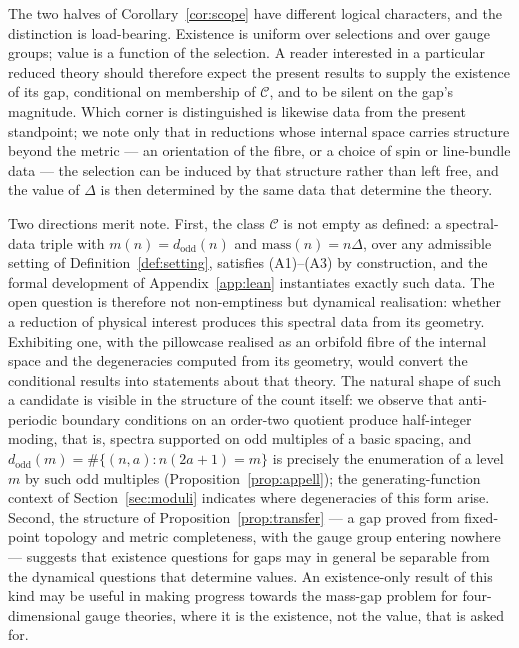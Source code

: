 \documentclass[11pt,a4paper]{article}
\newcommand{\dodd}{d_{\mathrm{odd}}}
\newcommand{\class}{\mathcal{C}}
\theoremstyle{plain}
\theoremstyle{definition}
\theoremstyle{remark}
\begin{document}
The two halves of Corollary~\ref{cor:scope} have different logical characters, and the distinction is load-bearing. Existence is uniform over selections and over gauge groups; value is a function of the selection. A reader interested in a particular reduced theory should therefore expect the present results to supply the existence of its gap, conditional on membership of $\class$, and to be silent on the gap's magnitude. Which corner is distinguished is likewise data from the present standpoint; we note only that in reductions whose internal space carries structure beyond the metric --- an orientation of the fibre, or a choice of spin or line-bundle data --- the selection can be induced by that structure rather than left free, and the value of $\Delta$ is then determined by the same data that determine the theory.

Two directions merit note. First, the class $\class$ is not empty as defined: a spectral-data triple with $m(n) = \dodd(n)$ and $\mathrm{mass}(n) = n\Delta$, over any admissible setting of Definition~\ref{def:setting}, satisfies (A1)--(A3) by construction, and the formal development of Appendix~\ref{app:lean} instantiates exactly such data. The open question is therefore not non-emptiness but dynamical realisation: whether a reduction of physical interest produces this spectral data from its geometry. Exhibiting one, with the pillowcase realised as an orbifold fibre of the internal space and the degeneracies computed from its geometry, would convert the conditional results into statements about that theory. The natural shape of such a candidate is visible in the structure of the count itself: we observe that anti-periodic boundary conditions on an order-two quotient produce half-integer moding, that is, spectra supported on odd multiples of a basic spacing, and $\dodd(m) = \#\{(n,a) : n(2a+1) = m\}$ is precisely the enumeration of a level $m$ by such odd multiples (Proposition~\ref{prop:appell}); the generating-function context of Section~\ref{sec:moduli} indicates where degeneracies of this form arise. Second, the structure of Proposition~\ref{prop:transfer} --- a gap proved from fixed-point topology and metric completeness, with the gauge group entering nowhere --- suggests that existence questions for gaps may in general be separable from the dynamical questions that determine values. An existence-only result of this kind may be useful in making progress towards the mass-gap problem for four-dimensional gauge theories, where it is the existence, not the value, that is asked for.
\end{document}
